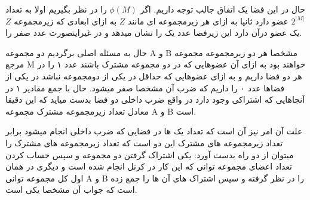 \documentclass{article}[12pt]
\begin{document}
حال در این فضا یک اتفاق جالب توجه داریم. اگر 
$\phi(M)$
را در نظر بگیریم اولا به تعداد 
$2^{|M|}$
عضو دارد ثانیا به ازای هر زیرمجموعه ای مانند $Z$
به ازای ابعادی که زیرمجموعه $Z$
یک عضو درآن دارد این زیرفضا عدد یک را نشان میدهد و در غیراینصورت عدد صفر را.

حال به مسئله اصلی برگردیم دو مجموعه A
و B
مشخصا هر دو زیرمجموعه مجموعه مرجع M
خواهند بود به ازای آن عضوهایی که در دو مجموعه مشترک باشند عدد ۱ را در هر دو فضا داریم و به ازای عضوهایی که حداقل در یکی از دومجموعه نباشد در یکی از فضاها عدد ۰ را داریم که ضرب آن مشخصا صفر میشود. 
حال با جمع مقادیر ۱ در آنجاهایی که اشتراکی وجود دارد در واقع ضرب داخلی دو فضا بدست میاید که این دقیقا معادل تعداد زیرمجموعه مشترک مجموعه 
A
و
B
است.


علت آن امر نیز آن است که تعداد یک ها در فضایی که ضرب داخلی انجام میشود برابر تعداد زیرمجموعه های مشترک این دو است که تعداد زیرمجموعه های مشترک را میتوان از دو راه بدست آورد:
یکی اشتراک گرفتن دو مجموعه و سپس حساب کردن تعداد اعضای مجموعه توانی که این کار در کرنل انجام شده است و دیگری 
در همان اول کل مجموعه توانی 
A
و
B 
را در نظر گرفته و سپس اشتراک های آن ها را جمع زده است که جواب آن مشخصا یکی است.
 
\end{document}
